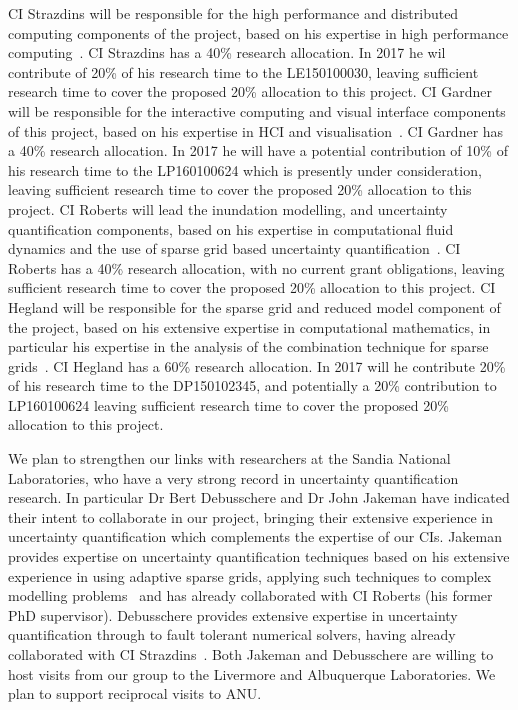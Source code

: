 CI Strazdins will be
responsible for the high performance and distributed computing
components of the project, based on his expertise in high performance
computing~\parencite{AliEtal2015,StrazdinsEtal2015,Ali11022016}.  
CI Strazdins has a 40\% research allocation. In 2017 he wil contribute of 20\%
 of his research time to the LE150100030, leaving sufficient research 
 time to cover the proposed 20\% allocation to this project. 
%
CI Gardner will be responsible for the interactive computing and visual interface components of this project, based on
his expertise in HCI and visualisation~\parencite{martin2016intelligent,martin2015tracking,swift2014coding,swift2013visual,sorensen2010programming,swiftLive2016}.  CI Gardner has a 40\% research allocation. In 2017 he will have a potential contribution of 10\% of his research time to the LP160100624 which is presently under consideration, leaving sufficient research time to cover the proposed 20\% allocation to this project. 
%
CI Roberts will lead the inundation modelling, and
uncertainty quantification components, based on his expertise in
computational fluid dynamics and the use of sparse grid based
uncertainty quantification~\parencite{deBaarRDM2015,JakemanRoberts2013,anugamanual,nielsen2005hydrodynamic}.  
CI Roberts has a 40\% research allocation, with no current grant obligations,  
leaving sufficient research time to cover the proposed 20\% allocation to this project. 
%
CI Hegland will be responsible for the
sparse grid and reduced model component of the project, based on his
extensive expertise in computational mathematics, in particular his
expertise in the analysis of the combination technique for sparse
grids~\parencite{AliEtal2015,HardingHLS2015,Ali11022016}. 
CI Hegland has a 60\% research allocation. In 2017 will he contribute 
20\% of his research time to the DP150102345, and potentially a  20\% 
contribution to LP160100624 leaving sufficient research time 
to cover the proposed 20\% allocation to this project. 

We plan to strengthen our links with researchers at the Sandia National Laboratories, who have
a very strong record in uncertainty quantification research. In particular Dr Bert Debusschere and 
Dr John Jakeman have indicated their intent to collaborate in our project, bringing their
extensive experience in uncertainty quantification which complements the expertise of our CIs.  
Jakeman provides expertise on uncertainty
quantification techniques based on his extensive experience in using adaptive sparse grids,
applying such techniques to complex modelling 
problems~\parencite{JakemanRoberts2013,jakemanNumerical2010,Jakeman2015} and 
has already collaborated with CI Roberts (his former PhD supervisor). 
Debusschere provides extensive expertise in uncertainty
quantification through to fault tolerant numerical solvers, having already 
collaborated with CI Strazdins~\parencite{parSGCT16}.
Both Jakeman and Debusschere are willing to host visits from our group to the Livermore and 
Albuquerque Laboratories. We plan to support reciprocal visits to ANU. 


